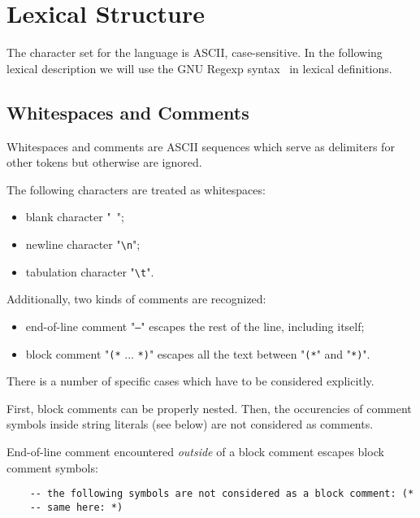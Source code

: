 \section{Lexical Structure}
\label{sec:lexical_structure}

The character set for the language is \textsc{ASCII}, case-sensitive. In the following lexical description we will use
the GNU Regexp syntax~\cite{GNULib} in lexical definitions.

\subsection{Whitespaces and Comments}

Whitespaces and comments are \textsc{ASCII} sequences which serve as delimiters for other tokens but otherwise are
ignored.

The following characters are treated as whitespaces:

\begin{itemize}
\item blank character "\texttt{ }";
\item newline character "\texttt{\textbackslash n}";
\item tabulation character "\texttt{\textbackslash t}".
\end{itemize}

Additionally, two kinds of comments are recognized:

\begin{itemize}
\item end-of-line comment "\texttt{--}" escapes the rest of the line, including itself;
\item block comment "\texttt{(*} ... \texttt{*)}" escapes all the text between
  "\texttt{(*}" and "\texttt{*)}".
\end{itemize}

There is a number of specific cases which have to be considered explicitly.

First, block comments can be properly nested. Then, the occurencies of comment symbols inside string literals (see below) are not
considered as comments.

End-of-line comment encountered \emph{outside} of a block comment escapes block comment symbols:

\begin{lstlisting}
    -- the following symbols are not considered as a block comment: (*
    -- same here: *)
\end{lstlisting}

